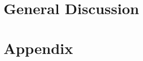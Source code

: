\documentclass[12pt,a4paper,twoside,openright]{book}
\makeatletter
\def\cleardoublepage{\clearpage\if@twoside \ifodd\c@page\else
    \hbox{}
    \thispagestyle{plain}
    \newpage
    \if@twocolumn\hbox{}\newpage\fi\fi\fi}
\makeatother
\begin{document}
\begin{sloppy}
\newpage
\thispagestyle{empty}
\chapter{General Discussion \label{ch:discussion}}
\thispagestyle{empty}
\cleardoublepage


\printbibliography

\newpage
\chapter{Appendix}
\cleardoublepage



\end{sloppy}
\end{document}
